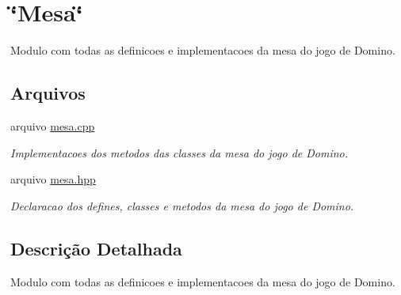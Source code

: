 \hypertarget{group__MOD__MESA}{
\section{\char`\"{}Mesa\char`\"{}}
\label{group__MOD__MESA}
}


Modulo com todas as definicoes e implementacoes da mesa do jogo de Domino.  


\subsection*{Arquivos}
\begin{DoxyCompactItemize}
\item 
arquivo \hyperlink{mesa_8cpp}{mesa.cpp}


\begin{DoxyCompactList}\small\item\em Implementacoes dos metodos das classes da mesa do jogo de Domino. \item\end{DoxyCompactList}

\item 
arquivo \hyperlink{mesa_8hpp}{mesa.hpp}


\begin{DoxyCompactList}\small\item\em Declaracao dos defines, classes e metodos da mesa do jogo de Domino. \item\end{DoxyCompactList}

\end{DoxyCompactItemize}


\subsection{Descrição Detalhada}
Modulo com todas as definicoes e implementacoes da mesa do jogo de Domino. 